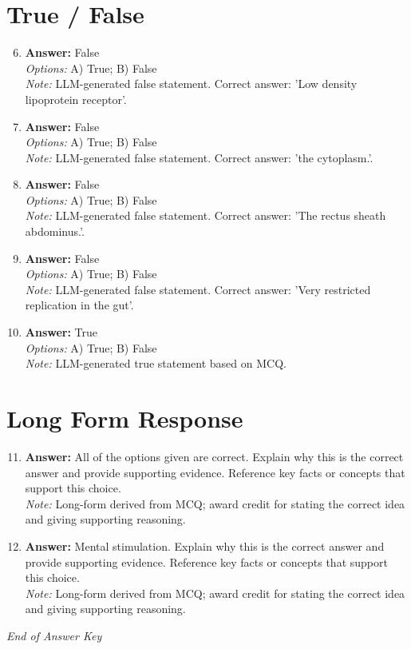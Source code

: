 \documentclass[12pt]{article}
\begin{document}
\section*{True / False}
\begin{enumerate}[label=\arabic*.]
\setcounter{enumi}{5}
\item \textbf{Answer:} False
\\ \textit{Options:} A) True; B) False
\\ \textit{Note:} LLM-generated false statement. Correct answer: 'Low density lipoprotein receptor'.
\item \textbf{Answer:} False
\\ \textit{Options:} A) True; B) False
\\ \textit{Note:} LLM-generated false statement. Correct answer: 'the cytoplasm.'.
\item \textbf{Answer:} False
\\ \textit{Options:} A) True; B) False
\\ \textit{Note:} LLM-generated false statement. Correct answer: 'The rectus sheath abdominus.'.
\item \textbf{Answer:} False
\\ \textit{Options:} A) True; B) False
\\ \textit{Note:} LLM-generated false statement. Correct answer: 'Very restricted replication in the gut'.
\item \textbf{Answer:} True
\\ \textit{Options:} A) True; B) False
\\ \textit{Note:} LLM-generated true statement based on MCQ.
\end{enumerate}

\section*{Long Form Response}
\begin{enumerate}[label=\arabic*.]
\setcounter{enumi}{10}
\item \textbf{Answer:} All of the options given are correct. Explain why this is the correct answer and provide supporting evidence. Reference key facts or concepts that support this choice.
\\ \textit{Note:} Long-form derived from MCQ; award credit for stating the correct idea and giving supporting reasoning.
\item \textbf{Answer:} Mental stimulation. Explain why this is the correct answer and provide supporting evidence. Reference key facts or concepts that support this choice.
\\ \textit{Note:} Long-form derived from MCQ; award credit for stating the correct idea and giving supporting reasoning.
\end{enumerate}

\vfill
\noindent\textit{End of Answer Key}
\end{document}
